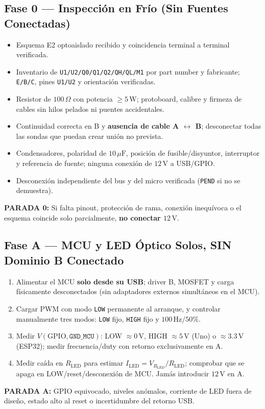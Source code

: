 \documentclass[10pt, a4paper, landscape]{article}
\begin{document}
\begin{minipage}[t]{0.49\linewidth}
\subsection*{Fase 0 — Inspección en Frío (Sin Fuentes Conectadas)}
\begin{itemize}[label=$\square$, noitemsep, topsep=2pt]
    \item Esquema E2 optoaislado recibido y coincidencia terminal a terminal verificada.
    \item Inventario de \texttt{U1/U2/Q0/Q1/Q2/QH/QL/M1} por part number y fabricante; \texttt{E/B/C}, pines \texttt{U1/U2} y orientación verificadas.
    \item Resistor de $100\,\Omega$ con potencia $\ge 5\,\text{W}$; protoboard, calibre y firmeza de cables sin hilos pelados ni puentes accidentales.
    \item Continuidad correcta en B y \textbf{ausencia de cable A $\leftrightarrow$ B}; desconectar todas las sondas que puedan crear unión no prevista.
    \item Condensadores, polaridad de $10\,\mu\text{F}$, posición de fusible/disyuntor, interruptor y referencia de fuente; ninguna conexión de $12\,\text{V}$ a USB/GPIO.
    \item Desconexión independiente del bus y del micro verificada (\texttt{PEND} si no se demuestra).
\end{itemize}
\noindent\textbf{\textcolor{warnred}{PARADA 0:}} Si falta pinout, protección de rama, conexión inequívoca o el esquema coincide solo parcialmente, \textbf{no conectar $12\,\text{V}$}.

\subsection*{Fase A — MCU y LED Óptico Solos, SIN Dominio B Conectado}
\begin{enumerate}[noitemsep, topsep=2pt]
    \item Alimentar el MCU \textbf{solo desde su USB}; driver B, MOSFET y carga físicamente desconectados (sin adaptadores externos simultáneos en el MCU).
    \item Cargar PWM con modo \texttt{LOW} permanente al arranque, y controlar manualmente tres modos: \texttt{LOW} fijo, \texttt{HIGH} fijo y $100\,\text{Hz}/50\%$.
    \item Medir $V(\text{GPIO}, \texttt{GND\_MCU})$: LOW $\approx 0\,\text{V}$, HIGH $\approx 5\,\text{V}$ (Uno) o $\approx 3.3\,\text{V}$ (ESP32); medir frecuencia/duty con retorno exclusivamente en A.
    \item Medir caída en $R_{\text{LED}}$ para estimar $I_{\text{LED}} = V_{R_{\text{LED}}}/R_{\text{LED}}$; comprobar que se apaga en LOW/reset/desconexión de MCU. Jamás introducir $12\,\text{V}$ en A.
\end{enumerate}
\noindent\textbf{\textcolor{warnred}{PARADA A:}} GPIO equivocado, niveles anómalos, corriente de LED fuera de diseño, estado alto al reset o incertidumbre del retorno USB.


\end{minipage}
\end{document}
